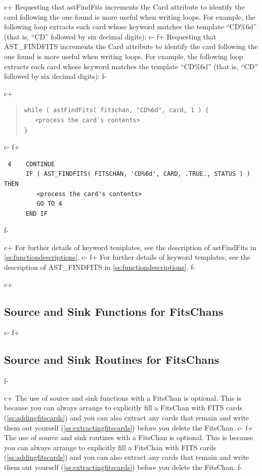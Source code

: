 \documentclass[twoside,11pt]{article}
\newcommand{\appref}[1]{Appendix~\ref{#1}}
\newcommand{\secref}[1]{\S\ref{#1}}
\renewcommand{\appref}[1]{\ref{#1}}
\renewcommand{\secref}[1]{\ref{#1}}
\begin{document}
c+
Requesting that astFindFits increments the Card attribute to identify
the card following the one found is more useful when writing loops.
For example, the following loop extracts each card whose keyword
matches the template ``CD\%6d'' (that is, ``CD'' followed by six
decimal digits):
c-
f+
Requesting that AST\_FINDFITS increments the Card attribute to
identify the card following the one found is more useful when writing
loops.  For example, the following loop extracts each card whose
keyword matches the template ``CD\%6d'' (that is, ``CD'' followed by
six decimal digits):
f-

c+
\begin{quote}
\small
\begin{verbatim}
while ( astFindFits( fitschan, "CD%6d", card, 1 ) {
   <process the card's contents>
}
\end{verbatim}
\normalsize
\end{quote}
c-
f+
\small
\begin{verbatim}
 4    CONTINUE
      IF ( AST_FINDFITS( FITSCHAN, 'CD%6d', CARD, .TRUE., STATUS ) ) THEN
         <process the card's contents>
         GO TO 4
      END IF
\end{verbatim}
\normalsize
f-

c+
For further details of keyword templates, see the description of
astFindFits in \appref{ss:functiondescriptions}.
c-
f+
For further details of keyword templates, see the description of
AST\_FINDFITS in \appref{ss:functiondescriptions}.
f-

c+
\subsection{\label{ss:fitssourceandsink}Source and Sink Functions for FitsChans}
c-
f+
\subsection{\label{ss:fitssourceandsink}Source and Sink Routines for FitsChans}
f-

c+
The use of source and sink functions with a FitsChan is optional. This
is because you can always arrange to explicitly fill a FitsChan with
FITS cards (\secref{ss:addingfitscards}) and you can also extract any
cards that remain and write them out yourself
(\secref{ss:extractingfitscards}) before you delete the FitsChan.
c-
f+
The use of source and sink routines with a FitsChan is optional. This
is because you can always arrange to explicitly fill a FitsChan with
FITS cards (\secref{ss:addingfitscards}) and you can also extract any
cards that remain and write them out yourself
(\secref{ss:extractingfitscards}) before you delete the FitsChan.
f-
\end{document}
